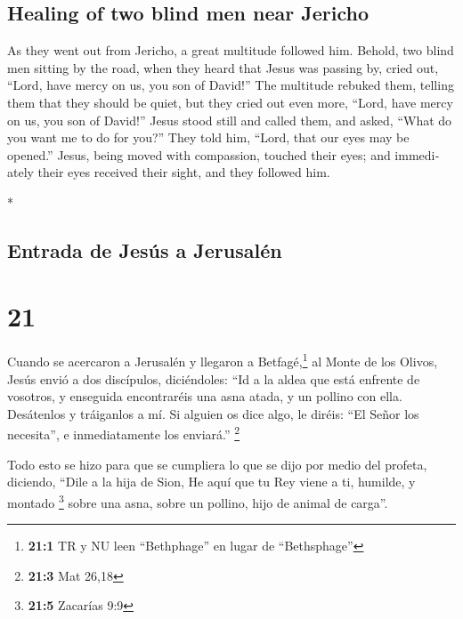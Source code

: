 \begin{paracol}{2}
\begin{otherlanguage}{english}
\hypertarget{healing-of-two-blind-men-near-jericho}{%
\subsection{Healing of two blind men near
Jericho}\label{healing-of-two-blind-men-near-jericho}}

 As they went out from Jericho, a great multitude
followed him.  Behold, two blind men sitting by the road,
when they heard that Jesus was passing by, cried out, ``Lord, have mercy
on us, you son of David!''  The multitude rebuked them,
telling them that they should be quiet, but they cried out even more,
``Lord, have mercy on us, you son of David!''  Jesus
stood still and called them, and asked, ``What do you want me to do for
you?''  They told him, ``Lord, that our eyes may be
opened.''  Jesus, being moved with compassion, touched
their eyes; and immediately their eyes received their sight, and they
followed him.

\end{otherlanguage}

\switchcolumn[0]*

\hypertarget{entrada-de-jesuxfas-a-jerusaluxe9n}{%
\subsection{Entrada de Jesús a
Jerusalén}\label{entrada-de-jesuxfas-a-jerusaluxe9n}}

\hypertarget{section-40}{%
\section{21}\label{section-40}}

 Cuando se acercaron a Jerusalén y llegaron a
Betfagé,\footnote{\textbf{21:1} TR y NU leen ``Bethphage'' en lugar de
  ``Bethsphage''} al Monte de los Olivos, Jesús envió a dos discípulos,
 diciéndoles: ``Id a la aldea que está enfrente de
vosotros, y enseguida encontraréis una asna atada, y un pollino con
ella. Desátenlos y tráiganlos a mí.  Si alguien os dice
algo, le diréis: ``El Señor los necesita'', e inmediatamente los
enviará.'' \footnote{\textbf{21:3} Mat 26,18}

 Todo esto se hizo para que se cumpliera lo que se dijo
por medio del profeta, diciendo,  ``Dile a la hija de
Sion, He aquí que tu Rey viene a ti, humilde, y montado \footnote{\textbf{21:5}
  Zacarías 9:9} sobre una asna, sobre un pollino, hijo de animal de
carga''.


\end{paracol}
